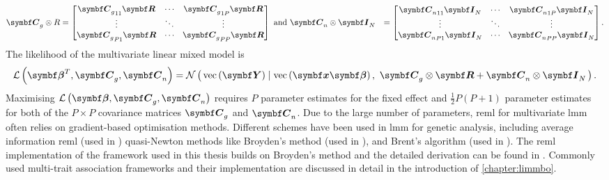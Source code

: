 \begin{align*}
 \mat{C}_g \otimes R &=
  \begin{bmatrix}
  {\mat{C}_g}_{11}\mat{R}  &  \cdots &  {\mat{C}_g}_{1P}\mat{R}  \\
   \vdots &  \ddots & \vdots \\
  {\mat{C}_g}_{P1}\mat{R}  &  \cdots &  {\mat{C}_g}_{PP}\mat{R}  \\
   \end{bmatrix} \text{ and }
    \mat{C}_n \otimes  \mat{I}_N&=
  \begin{bmatrix}
  {\mat{C}_n}_{11}\mat{I}_N &  \cdots &  {\mat{C}_n}_{1P}\mat{I}_N  \\
   \vdots &  \ddots & \vdots \\
  {\mat{C}_n}_{P1}\mat{I}_N  &  \cdots &  {\mat{C}_n}_{PP}\mat{I}_N  \\
   \end{bmatrix}.
\end{align*}
%
The likelihood of the multivariate linear mixed model is
%
\begin{equation}
\mathcal{L}\left(\mat{\beta}^T, \mat{C}_g, \mat{C}_n\right) = \normal {\text{vec}\left(\mat{Y}\right) \mid \text{vec}\left(\mat{x}\mat{\beta}\right)}{\mat{C}_g \otimes\mat{R} + \mat{C}_n \otimes\mat{I}_N}.
\label{eq:lmm-mv-likelihood}
\end{equation}
%
Maximising \(\mathcal{L}\left(\mat{\beta}, \mat{C}_g, \mat{C}_n\right)\) requires \(P\) parameter estimates for the fixed effect \tmat{\beta} and \(\frac{1}{2}P \left( P + 1\right)\) parameter estimates for both of the \(P \times P\) covariance matrices \(\mat{C}_g\) and  \(\mat{C}_n\). Due to the large number of parameters, \gls{reml} for multivariate \gls{lmm} often relies on gradient-based optimisation methods. Different schemes have been used in \gls{lmm} for genetic analysis, including average information \gls{reml} \citep{Gilmour1995} (used in \citep{Yang2011}) quasi-Newton methods like Broyden's method \citep{Broyden1965} (used in \citep{Casale2015}), and Brent's algorithm \citep{Brent1971} (used in \citep{Lippert2011,Svishcheva2012}). The \gls{reml} implementation of the framework used in this thesis builds on Broyden's method and the detailed derivation can be found in \citep[Supplementary material]{Casale2015}. Commonly used multi-trait association frameworks and their implementation are discussed in detail in the introduction of \cref{chapter:limmbo}. 


